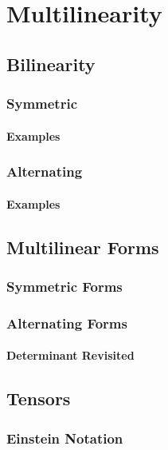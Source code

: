 \chapter{Multilinearity}\label{ch:multilin}
\section{Bilinearity}
\subsection{Symmetric}
\subsubsection{Examples}
\subsection{Alternating}
\subsubsection{Examples}

\section{Multilinear Forms}
\subsection{Symmetric Forms}
\subsection{Alternating Forms}
\subsubsection{Determinant Revisited}

\section{Tensors}
\subsection{Einstein Notation}
